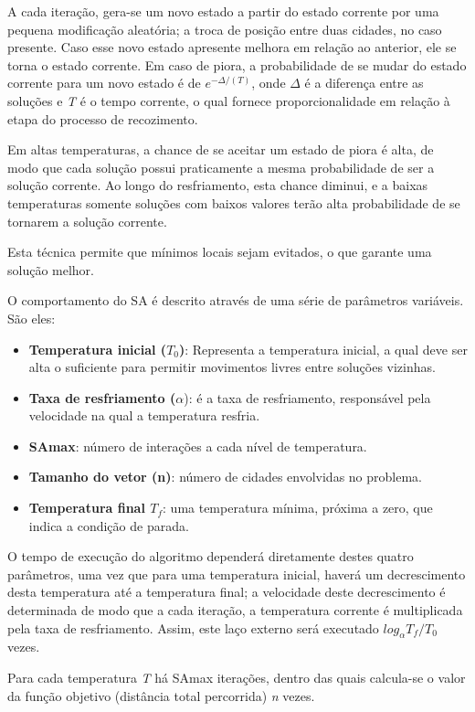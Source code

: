 \documentclass[a4paper, 12pt]{article}
\begin{document}
A cada iteração, gera-se um novo estado a partir do estado corrente por uma pequena modificação aleatória; a troca de posição entre duas cidades, no caso presente. Caso esse novo estado apresente melhora em relação ao anterior, ele se torna o estado corrente. Em caso de piora, a probabilidade de se mudar do estado corrente para um novo estado é de $e^{-\Delta/(T)}$, onde $\Delta$ é a diferença entre as soluções e \textit{T} é o tempo corrente, o qual fornece proporcionalidade em relação à etapa do processo de recozimento\cite{kirk}.

Em altas temperaturas, a chance de se aceitar um estado de piora é alta, de modo que cada solução possui praticamente a mesma probabilidade de ser a solução corrente. Ao longo do resfriamento, esta chance diminui, e a baixas temperaturas somente soluções com baixos valores terão alta probabilidade de se tornarem a solução corrente. 

Esta técnica permite que mínimos locais sejam evitados, o que garante uma solução melhor.

O comportamento do SA é descrito através de uma série de parâmetros variáveis. São eles:

\begin{itemize}
\item \textbf{Temperatura inicial ($T_0$)}: Representa a temperatura inicial, a qual deve ser alta o suficiente para permitir movimentos livres entre soluções vizinhas.
\item \textbf{Taxa de resfriamento ($\alpha$}): é a taxa de resfriamento, responsável pela velocidade na qual a temperatura resfria.
\item \textbf{SAmax}: número de interações a cada nível de temperatura.
\item \textbf{Tamanho do vetor (n)}: número de cidades envolvidas no problema.
\item \textbf{Temperatura final $T_f$}: uma temperatura mínima, próxima a zero, que indica a condição de parada.
\end{itemize}

O tempo de execução do algoritmo dependerá diretamente destes quatro parâmetros, uma vez que para uma temperatura inicial, haverá um decrescimento desta temperatura até a temperatura final; a velocidade deste decrescimento é determinada de modo que a cada iteração, a temperatura corrente é multiplicada pela taxa de resfriamento. Assim, este laço externo será executado $log_\alpha T_f/T_0$ vezes.

Para cada temperatura \textit{T} há SAmax iterações, dentro das quais calcula-se o valor da função objetivo (distância total percorrida) \textit{n} vezes.
\end{document}
